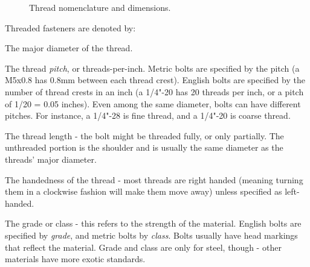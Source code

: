 	\begin{figure}[H]
		
		\caption{Thread nomenclature and dimensions.}
	\end{figure}
	
	Threaded fasteners are denoted by:
	\begin{asparaitem}
		\item The major diameter of the thread.
		\item The thread \textit{pitch}, or threads-per-inch. Metric bolts are specified by the pitch (a M5x0.8 has 0.8mm between each thread crest). English bolts are specified by the number of thread crests in an inch (a 1/4"-20 has 20 threads per inch, or a pitch of 1/20 = 0.05 inches). Even among the same diameter, bolts can have different pitches. For instance, a 1/4"-28 is fine thread, and a 1/4"-20 is coarse thread.
		\item The thread length - the bolt might be threaded fully, or only partially. The unthreaded portion is the shoulder and is usually the same diameter as the threads' major diameter.
		\item The handedness of the thread - most threads are right handed (meaning turning them in a clockwise fashion will make them move away) unless specified as left-handed.
		\item The grade or class - this refers to the strength of the material. English bolts are specified by \textit{grade}, and metric bolts by \textit{class}. Bolts usually have head markings that reflect the material. Grade and class are only for steel, though - other materials have more exotic standards.
	\end{asparaitem}
	
